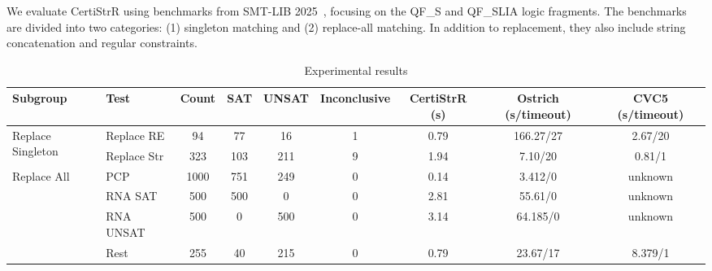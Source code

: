 We evaluate {CertiStrR} using benchmarks from SMT-LIB 2025~\cite{smtlib_benchmarks}, focusing on the \textsf{QF\_S} and \textsf{QF\_SLIA} logic fragments. The benchmarks are divided into two categories: (1) singleton matching and (2) replace-all matching. In addition to replacement, they also include string concatenation and regular constraints.






\begin{table}[h]
\centering
\small
\setlength{\tabcolsep}{4pt}
\renewcommand{\arraystretch}{1.1}
\begin{tabular}{llccccccc}
  \toprule
  \textbf{Subgroup} & \textbf{Test} & \textbf{Count} & \textbf{SAT} & \textbf{UNSAT} & \textbf{Inconclusive} & \textbf{CertiStrR (s)} & \textbf{Ostrich (s/timeout)} & \textbf{CVC5 (s/timeout)} \\
  \midrule
  \multirow{2}{*}{Replace Singleton} & Replace RE  & 94  & 77  & 16  & 1 & 0.79 & 166.27/27 & 2.67/20 \\
   & Replace Str & 323 & 103 & 211 & 9 & 1.94 & 7.10/20 & 0.81/1 \\
  \multirow{4}{*}{Replace All} & PCP & 1000 & 751 & 249 & 0 & 0.14 & 3.412/0 & unknown \\
   & RNA SAT   & 500  & 500 & 0   & 0 & 2.81 & 55.61/0 & unknown \\
   & RNA UNSAT & 500  & 0   & 500 & 0 & 3.14 & 64.185/0 & unknown \\
   & Rest      & 255  & 40  & 215 & 0 & 0.79 & 23.67/17 & 8.379/1 \\
  \bottomrule
\end{tabular}
\caption{Experimental results}
\label{tab:string_operations}
\end{table}



